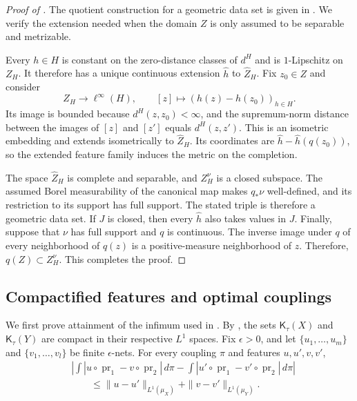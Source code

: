 \documentclass[10pt,a4paper]{amsart}
\newcommand{\Kc}{\mathsf K}
\DeclareMathOperator{\pr}{pr}
\begin{document}
\begin{proof}[Proof of ]
The quotient construction for a geometric data set is given in \cite[Definition~3.16, Proposition~3.17, Claim~3.18, and Proposition~3.19]{gds1}. We verify the extension needed when the domain $Z$ is only assumed to be separable and metrizable.

Every $h\in H$ is constant on the zero-distance classes of $d^H$ and is $1$-Lipschitz on $Z_H$. It therefore has a unique continuous extension $\widehat h$ to $\widehat Z_H$. Fix $z_0\in Z$ and consider
\[
Z_H\longrightarrow\ell^\infty(H),\qquad
[z]\longmapsto(h(z)-h(z_0))_{h\in H}.
\]
Its image is bounded because $d^H(z,z_0)<\infty$, and the supremum-norm distance between the images of $[z]$ and $[z']$ equals $d^H(z,z')$. This is an isometric embedding and extends isometrically to $\widehat Z_H$. Its coordinates are $\widehat h-\widehat h(q(z_0))$, so the extended feature family induces the metric on the completion.

The space $\widehat Z_H$ is complete and separable, and $Z_H^\nu$ is a closed subspace. The assumed Borel measurability of the canonical map makes $q_*\nu$ well-defined, and its restriction to its support has full support. The stated triple is therefore a geometric data set. If $J$ is closed, then every $\widehat h$ also takes values in $J$. Finally, suppose that $\nu$ has full support and $q$ is continuous. The inverse image under $q$ of every neighborhood of $q(z)$ is a positive-measure neighborhood of $z$. Therefore, $q(Z)\subset Z_H^\nu$. This completes the proof.
\end{proof}

\subsection{Compactified features and optimal couplings}
\label{subsec:app-feature-coupling}

We first prove attainment of the infimum used in . By , the sets $\Kc_\tau(X)$ and $\Kc_\tau(Y)$ are compact in their respective $L^1$ spaces. Fix $\epsilon>0$, and let $\{u_1,\ldots,u_m\}$ and $\{v_1,\ldots,v_l\}$ be finite $\epsilon$-nets. For every coupling $\pi$ and features $u,u',v,v'$,
\[
\begin{aligned}
&\left|\int|u\circ\pr_1-v\circ\pr_2|\,d\pi
-\int|u'\circ\pr_1-v'\circ\pr_2|\,d\pi\right|\\
&\qquad\leq
\|u-u'\|_{L^1(\mu_X)}+\|v-v'\|_{L^1(\mu_Y)}.
\end{aligned}
\]
\end{document}

